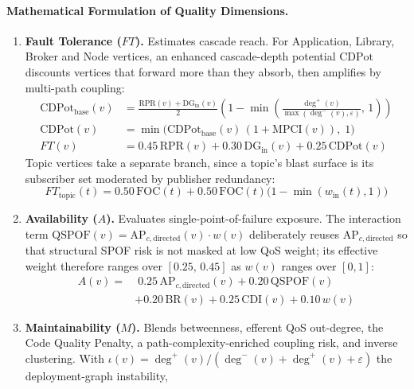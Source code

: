 \paragraph{Mathematical Formulation of Quality Dimensions.}
\begin{enumerate}
    \item \textbf{Fault Tolerance ($FT$).} Estimates cascade reach. For Application, Library, Broker and Node vertices, an enhanced cascade-depth potential $\mathrm{CDPot}$ discounts vertices that forward more than they absorb, then amplifies by multi-path coupling:
    \begin{equation}
    \begin{aligned}
    \mathrm{CDPot}_{\text{base}}(v) &= \frac{\mathrm{RPR}(v) + \mathrm{DG}_{\text{in}}(v)}{2}\left(1 - \min\!\left(\frac{\deg^{+}(v)}{\max(\deg^{-}(v),\varepsilon)},\, 1\right)\right) \\
    \mathrm{CDPot}(v) &= \min\!\big(\mathrm{CDPot}_{\text{base}}(v)\,(1 + \mathrm{MPCI}(v)),\; 1\big) \\
    FT(v) &= 0.45\,\mathrm{RPR}(v) + 0.30\,\mathrm{DG}_{\text{in}}(v) + 0.25\,\mathrm{CDPot}(v)
    \end{aligned}
    \end{equation}
    Topic vertices take a separate branch, since a topic's blast surface is its subscriber set moderated by publisher redundancy:
    \begin{equation}
    FT_{\text{topic}}(t) = 0.50\,\mathrm{FOC}(t) + 0.50\,\mathrm{FOC}(t)\big(1 - \min(w_{\text{in}}(t), 1)\big)
    \end{equation}
    \item \textbf{Availability ($A$).} Evaluates single-point-of-failure exposure. The interaction term $\mathrm{QSPOF}(v) = \mathrm{AP}_{c,\text{directed}}(v)\cdot w(v)$ deliberately reuses $\mathrm{AP}_{c,\text{directed}}$ so that structural SPOF risk is not masked at low QoS weight; its effective weight therefore ranges over $[0.25,\, 0.45]$ as $w(v)$ ranges over $[0,1]$:
    \begin{equation}
    \begin{aligned}
    A(v) = & \; 0.25\,\mathrm{AP}_{c,\text{directed}}(v) + 0.20\,\mathrm{QSPOF}(v) \\
           & + 0.20\,\mathrm{BR}(v) + 0.25\,\mathrm{CDI}(v) + 0.10\,w(v)
    \end{aligned}
    \end{equation}
    \item \textbf{Maintainability ($M$).} Blends betweenness, efferent QoS out-degree, the Code Quality Penalty, a path-complexity-enriched coupling risk, and inverse clustering. With $\iota(v) = \deg^{+}(v) / (\deg^{-}(v) + \deg^{+}(v) + \varepsilon)$ the deployment-graph instability,

\end{enumerate}
